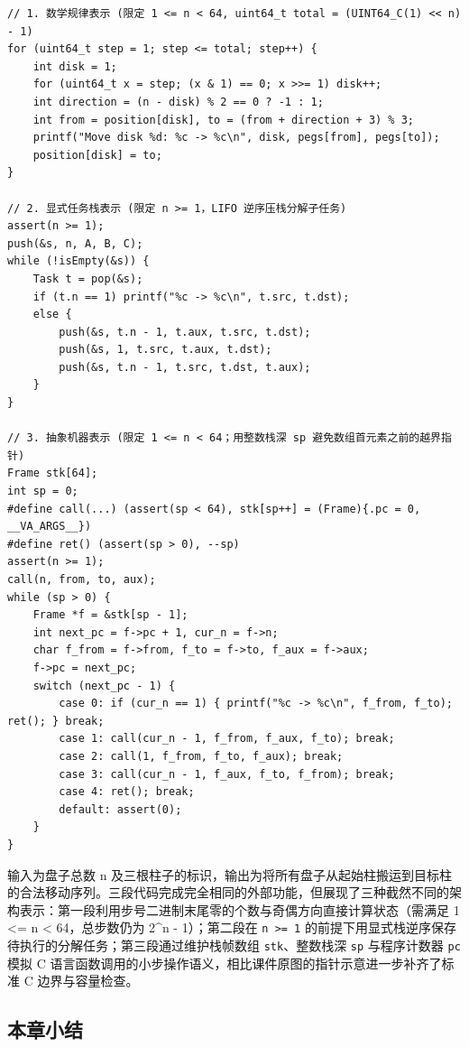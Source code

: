\documentclass[UTF8,a4paper,11pt,fontset=fandol]{ctexart}
\begin{document}
\begin{lstlisting}[basicstyle={\ttfamily\small\linespread{1}\selectfont},captionpos=t,caption={十行非递归汉诺塔的三种核心表示：数学规律、任务栈与抽象机器}]
// 1. 数学规律表示 (限定 1 <= n < 64, uint64_t total = (UINT64_C(1) << n) - 1)
for (uint64_t step = 1; step <= total; step++) {
    int disk = 1;
    for (uint64_t x = step; (x & 1) == 0; x >>= 1) disk++;
    int direction = (n - disk) % 2 == 0 ? -1 : 1;
    int from = position[disk], to = (from + direction + 3) % 3;
    printf("Move disk %d: %c -> %c\n", disk, pegs[from], pegs[to]);
    position[disk] = to;
}

// 2. 显式任务栈表示 (限定 n >= 1，LIFO 逆序压栈分解子任务)
assert(n >= 1);
push(&s, n, A, B, C);
while (!isEmpty(&s)) {
    Task t = pop(&s);
    if (t.n == 1) printf("%c -> %c\n", t.src, t.dst);
    else {
        push(&s, t.n - 1, t.aux, t.src, t.dst);
        push(&s, 1, t.src, t.aux, t.dst);
        push(&s, t.n - 1, t.src, t.dst, t.aux);
    }
}

// 3. 抽象机器表示 (限定 1 <= n < 64；用整数栈深 sp 避免数组首元素之前的越界指针)
Frame stk[64];
int sp = 0;
#define call(...) (assert(sp < 64), stk[sp++] = (Frame){.pc = 0, __VA_ARGS__})
#define ret() (assert(sp > 0), --sp)
assert(n >= 1);
call(n, from, to, aux);
while (sp > 0) {
    Frame *f = &stk[sp - 1];
    int next_pc = f->pc + 1, cur_n = f->n;
    char f_from = f->from, f_to = f->to, f_aux = f->aux;
    f->pc = next_pc;
    switch (next_pc - 1) {
        case 0: if (cur_n == 1) { printf("%c -> %c\n", f_from, f_to); ret(); } break;
        case 1: call(cur_n - 1, f_from, f_aux, f_to); break;
        case 2: call(1, f_from, f_to, f_aux); break;
        case 3: call(cur_n - 1, f_aux, f_to, f_from); break;
        case 4: ret(); break;
        default: assert(0);
    }
}
\end{lstlisting}

输入为盘子总数 n 及三根柱子的标识，输出为将所有盘子从起始柱搬运到目标柱的合法移动序列。三段代码完成完全相同的外部功能，但展现了三种截然不同的架构表示：第一段利用步号二进制末尾零的个数与奇偶方向直接计算状态（需满足 1 <= n < 64，总步数仍为 2\textasciicircum{}n - 1）；第二段在 \texttt{n >= 1} 的前提下用显式栈逆序保存待执行的分解任务；第三段通过维护栈帧数组 \texttt{stk}、整数栈深 \texttt{sp} 与程序计数器 \texttt{pc} 模拟 C 语言函数调用的小步操作语义，相比课件原图的指针示意进一步补齐了标准 C 边界与容量检查。

\subsection{本章小结}
\end{document}
